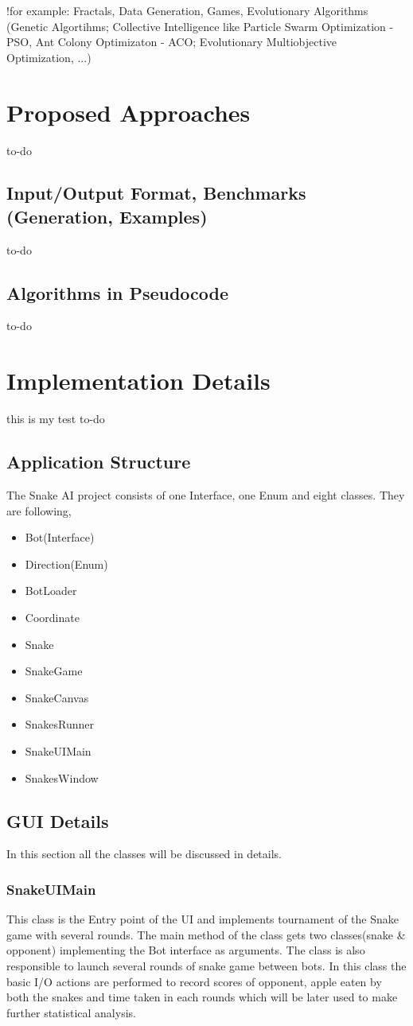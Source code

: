 \documentclass[a4paper,12pt]{article}
\begin{document}
!for example: Fractals, Data Generation, Games, Evolutionary Algorithms (Genetic Algortihms; Collective Intelligence like Particle Swarm Optimization - PSO, Ant Colony Optimizaton - ACO; Evolutionary Multiobjective Optimization, ...)

\section{Proposed Approaches}
to-do
\subsection{Input/Output Format, Benchmarks (Generation, Examples)}
to-do
\subsection{Algorithms in Pseudocode}
to-do

\section{Implementation Details}
 this is my test
to-do
\subsection{Application Structure}
The Snake AI project consists of one Interface, one Enum and eight classes. They are following, 

\begin{itemize}
\item Bot(Interface)
\item Direction(Enum)
\item BotLoader
\item Coordinate
\item Snake
\item SnakeGame
\item SnakeCanvas
\item SnakesRunner
\item SnakeUIMain
\item SnakesWindow
\end{itemize}

\subsection{GUI Details}
In this section all the classes will be discussed in details. 
\subsubsection{SnakeUIMain}
This class is the Entry point of the UI and implements tournament of the Snake game with several rounds. The main method of the class gets two classes(snake \& opponent) implementing the Bot interface as arguments. The class is also responsible to launch several rounds of snake game between bots. In this class the basic I/O actions are performed to record scores of opponent, apple eaten by both the snakes and time taken in each rounds which will be later used to make further statistical analysis.
\end{document}
